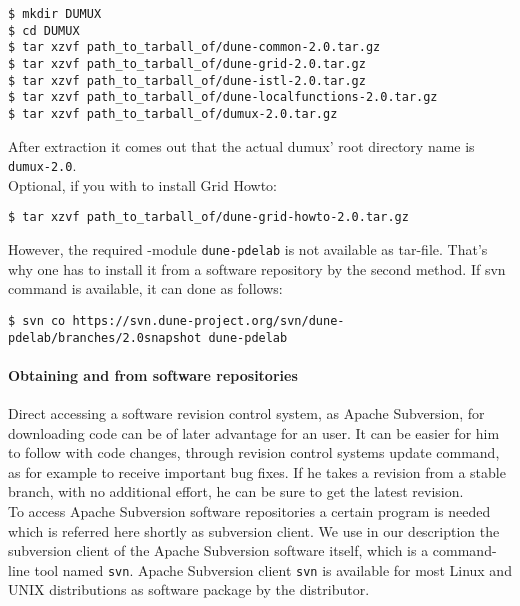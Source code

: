 \begin{lstlisting}[style=Bash]
$ mkdir DUMUX
$ cd DUMUX
$ tar xzvf path_to_tarball_of/dune-common-2.0.tar.gz 
$ tar xzvf path_to_tarball_of/dune-grid-2.0.tar.gz 
$ tar xzvf path_to_tarball_of/dune-istl-2.0.tar.gz 
$ tar xzvf path_to_tarball_of/dune-localfunctions-2.0.tar.gz 
$ tar xzvf path_to_tarball_of/dumux-2.0.tar.gz
\end{lstlisting}

After extraction it comes out that the actual dumux' root directory name is \texttt{dumux-2.0}.\\

Optional, if you with to install \Dune Grid Howto:

\begin{lstlisting}[style=Bash]
$ tar xzvf path_to_tarball_of/dune-grid-howto-2.0.tar.gz
\end{lstlisting}

However, the required \Dune-module \texttt{dune-pdelab} is not available as tar-file.
That's why one has to install it from a software repository by the second method.
If svn command is available, it can done as follows: 

\begin{lstlisting}[style=Bash]
$ svn co https://svn.dune-project.org/svn/dune-pdelab/branches/2.0snapshot dune-pdelab
\end{lstlisting}

\paragraph{Obtaining \Dune and \Dumux from software repositories} 

Direct accessing a software revision control system, as Apache Subversion, for downloading code can be of later advantage for an user. 
It can be easier for him to follow with code changes, through revision control systems update command, as for example to receive important bug fixes. If he takes a revision from a stable branch, with no additional effort, he can be sure to get the latest revision. \\

To access Apache Subversion software repositories a certain program is needed which is referred here shortly as subversion client. We use in our description the subversion client of the Apache Subversion software itself, which is a command-line tool named \texttt{svn}. 
Apache Subversion client \texttt{svn} is available for most Linux and UNIX distributions as software package by the distributor.

